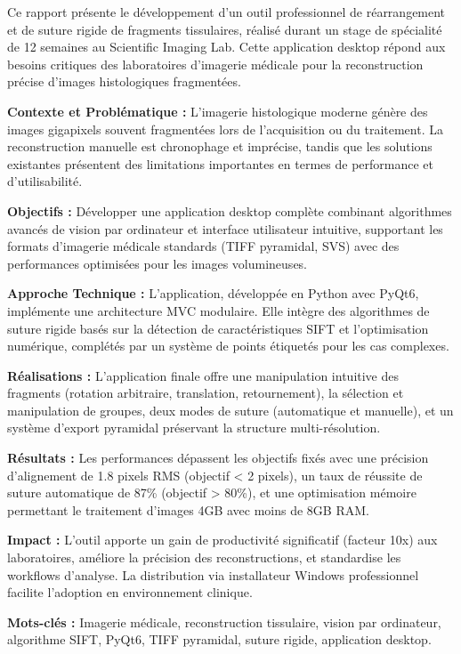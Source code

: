 \documentclass[12pt,a4paper]{article}
\begin{document}
Ce rapport présente le développement d'un outil professionnel de réarrangement et de suture rigide de fragments tissulaires, réalisé durant un stage de spécialité de 12 semaines au Scientific Imaging Lab. Cette application desktop répond aux besoins critiques des laboratoires d'imagerie médicale pour la reconstruction précise d'images histologiques fragmentées.

\textbf{Contexte et Problématique :} L'imagerie histologique moderne génère des images gigapixels souvent fragmentées lors de l'acquisition ou du traitement. La reconstruction manuelle est chronophage et imprécise, tandis que les solutions existantes présentent des limitations importantes en termes de performance et d'utilisabilité.

\textbf{Objectifs :} Développer une application desktop complète combinant algorithmes avancés de vision par ordinateur et interface utilisateur intuitive, supportant les formats d'imagerie médicale standards (TIFF pyramidal, SVS) avec des performances optimisées pour les images volumineuses.

\textbf{Approche Technique :} L'application, développée en Python avec PyQt6, implémente une architecture MVC modulaire. Elle intègre des algorithmes de suture rigide basés sur la détection de caractéristiques SIFT et l'optimisation numérique, complétés par un système de points étiquetés pour les cas complexes.

\textbf{Réalisations :} L'application finale offre une manipulation intuitive des fragments (rotation arbitraire, translation, retournement), la sélection et manipulation de groupes, deux modes de suture (automatique et manuelle), et un système d'export pyramidal préservant la structure multi-résolution.

\textbf{Résultats :} Les performances dépassent les objectifs fixés avec une précision d'alignement de 1.8 pixels RMS (objectif < 2 pixels), un taux de réussite de suture automatique de 87\% (objectif > 80\%), et une optimisation mémoire permettant le traitement d'images 4GB avec moins de 8GB RAM.

\textbf{Impact :} L'outil apporte un gain de productivité significatif (facteur 10x) aux laboratoires, améliore la précision des reconstructions, et standardise les workflows d'analyse. La distribution via installateur Windows professionnel facilite l'adoption en environnement clinique.

\textbf{Mots-clés :} Imagerie médicale, reconstruction tissulaire, vision par ordinateur, algorithme SIFT, PyQt6, TIFF pyramidal, suture rigide, application desktop.
\end{document}
